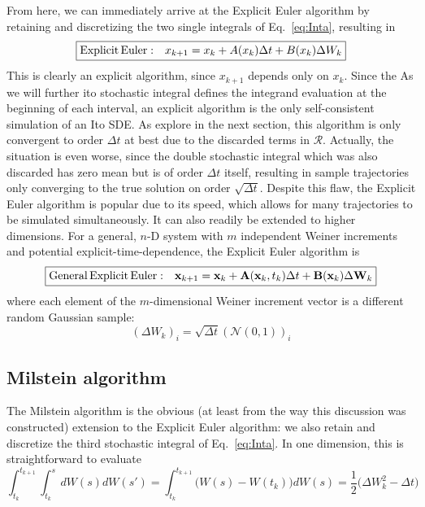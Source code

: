 \documentclass[onecolumn,notitlepage,pra,10pt,aps]{revtex4-1}
\newcommand {\be}{\begin{equation}}
\newcommand {\ee}{\end{equation}}
\begin{document}
From here, we can immediately arrive at the Explicit Euler algorithm by retaining and discretizing the two single integrals of Eq.~\eqref{eq:Inta}, resulting in 
\be
\boxed{
{\rm Explicit\, Euler:}\quad x_{k+1} = x_{k} + A(x_k)\Delta t +B(x_k) \Delta W_k \label{eq:EEuleralg}
}
\ee
This is clearly an explicit algorithm, since $x_{k+1}$ depends only on $x_k$.  Since the As we will further ito stochastic integral defines the integrand evaluation at the beginning of each interval, an explicit algorithm is the only self-consistent simulation of an Ito SDE.  As explore in the next section, this algorithm is only convergent to order $\Delta t$ at best due to the discarded terms in $\mathcal{R}$.  Actually, the situation is even worse, since the double stochastic integral which was also discarded has zero mean but is of order $\Delta t$ itself, resulting in sample trajectories only converging to the true solution on order $\sqrt{\Delta t}$.  Despite this flaw, the Explicit Euler algorithm is popular due to its speed, which allows for many trajectories to be simulated simultaneously.  It can also readily be extended to higher dimensions.  For a general, $n$-D system with $m$ independent Weiner increments and potential explicit-time-dependence, the Explicit Euler algorithm is 
\be
\boxed{
{\rm General\, Explicit\, Euler:}\quad \mathbf{x}_{k+1} = \mathbf{x}_{k} + \mathbf{A}(\mathbf{x}_k, t_k)\Delta t +\mathbf{B}(\mathbf{x}_k) \Delta \mathbf{W}_k
}
\ee
where each element of the $m$-dimensional Weiner increment vector is a different random Gaussian sample:
\be
(\Delta {W}_k)_i=\sqrt{\Delta t}(\mathcal{N}(0,1))_i
\ee

\subsection{Milstein algorithm}

The Milstein algorithm is the obvious (at least from the way this discussion was constructed) extension to the Explicit Euler algorithm: we also retain and discretize the third stochastic integral of Eq.~\eqref{eq:Inta}.  In one dimension, this is straightforward to evaluate \cite{Gardiner2004}
\be
\int_{t_k}^{t_{k+1}} \int_{t_k}^s dW(s)dW(s')
=\int_{t_k}^{t_{k+1}}  \big(W(s)-W(t_k)\big)dW(s)
=\frac{1}{2}\big(\Delta W_k^2-\Delta t\big) \label{eq:doubleSint}
\ee
\end{document}
